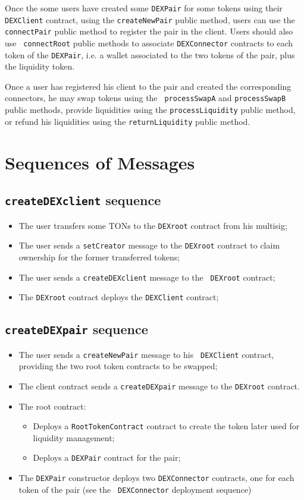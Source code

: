 Once the some users have created some {\tt DEXPair} for some tokens
using their {\tt DEXClient} contract, using the {\tt createNewPair}
public method, users can use the {\tt connectPair} public method to
register the pair in the client. Users should also use {\tt
  connectRoot} public methods to associate {\tt DEXConnector}
contracts to each token of the {\tt DEXPair}, i.e. a wallet associated
to the two tokens of the pair, plus the liquidity token.

Once a user has registered his client to the pair and created the
corresponding connectors, he may swap tokens using the {\tt
  processSwapA} and {\tt processSwapB} public methods, provide
liquidities using the {\tt processLiquidity} public method, or refund
his liquidities using the {\tt returnLiquidity} public method.

\section{Sequences of Messages}

\subsection{{\tt createDEXclient} sequence}

\begin{itemize}
\item The user transfers some TONs to the {\tt DEXroot} contract from
  his multisig;
\item The user sends a {\tt setCreator} message to the {\tt DEXroot}
  contract to claim ownership for the former transferred tokens;
\item The user sends a {\tt createDEXclient} message to the {\tt
  DEXroot} contract;
\item The {\tt DEXroot} contract deploys the {\tt DEXClient} contract;
\end{itemize}

\subsection{{\tt createDEXpair} sequence}

\begin{itemize}
\item The user sends a {\tt createNewPair} message to his {\tt
  DEXClient} contract, providing the two root token contracts to be
  swapped;
\item The client contract sends a {\tt createDEXpair} message to the
  {\tt DEXroot} contract.
\item The root contract:
  \begin{itemize}
  \item Deploys a {\tt RootTokenContract} contract to create the
    token later used for liquidity management;
  \item Deploys a {\tt DEXPair} contract for the pair;
  \end{itemize}
\item The {\tt DEXPair} constructor deploys two {\tt DEXConnector}
  contracts, one for each token of the pair (see the {\tt
    DEXConnector} deployment sequence)
\end{itemize}

